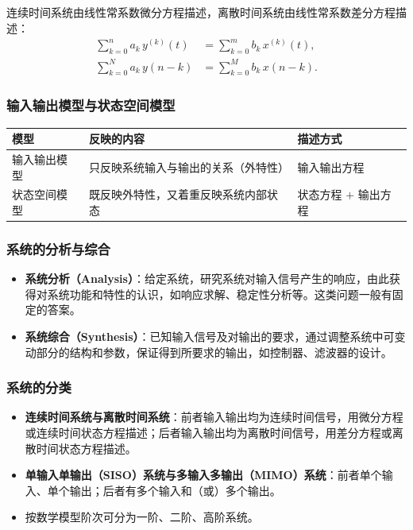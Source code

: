 连续时间系统由线性常系数微分方程描述，离散时间系统由线性常系数差分方程描述：
\begin{align}
\sum_{k=0}^{n} a_k\, y^{(k)}(t) &= \sum_{k=0}^{m} b_k\, x^{(k)}(t), \label{eq:ctsys}\\
\sum_{k=0}^{N} a_k\, y(n-k) &= \sum_{k=0}^{M} b_k\, x(n-k). \label{eq:dtsys}
\end{align}

\subsubsection{输入输出模型与状态空间模型}
\begin{center}
\begin{tabular}{lll}
\toprule
模型 & 反映的内容 & 描述方式 \\
\midrule
输入输出模型 & 只反映系统输入与输出的关系（外特性） & 输入输出方程 \\
状态空间模型 & 既反映外特性，又着重反映系统内部状态 & 状态方程 $+$ 输出方程 \\
\bottomrule
\end{tabular}
\end{center}

\subsubsection{系统的分析与综合}
\begin{itemize}
\item \textbf{系统分析（Analysis）}：给定系统，研究系统对输入信号产生的响应，由此获得对系统功能和特性的认识，如响应求解、稳定性分析等。这类问题一般有固定的答案。
\item \textbf{系统综合（Synthesis）}：已知输入信号及对输出的要求，通过调整系统中可变动部分的结构和参数，保证得到所要求的输出，如控制器、滤波器的设计。
\end{itemize}

\subsubsection{系统的分类}
\begin{itemize}
\item \textbf{连续时间系统与离散时间系统}：前者输入输出均为连续时间信号，用微分方程或连续时间状态方程描述；后者输入输出均为离散时间信号，用差分方程或离散时间状态方程描述。
\item \textbf{单输入单输出（SISO）系统与多输入多输出（MIMO）系统}：前者单个输入、单个输出；后者有多个输入和（或）多个输出。
\item 按数学模型阶次可分为一阶、二阶、高阶系统。
\end{itemize}

